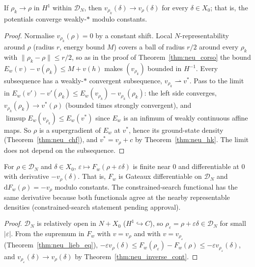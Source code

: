 \begin{theorem}
  \label{thm:neu_inverse_cont}
  \leanok
  If $\rho_k\to\rho$ in $H^1$ within $\mathcal D_N$, then $v_{\rho_k}(\delta)\to v_\rho(\delta)$ for every $\delta\in X_0$; that is,
  the potentials converge weakly-$*$ modulo constants.
\end{theorem}
\begin{proof}
  \leanok
  Normalise $v_{\rho_k}(\rho)=0$ by a constant shift. Local $N$-representability around $\rho$ (radius $r$, energy bound $M$)
  covers a ball of radius $r/2$ around every $\rho_k$ with $\|\rho_k-\rho\|\le r/2$, so as in the proof of
  Theorem~\ref{thm:neu_corso} the bound $E_w(v)-v(\rho_k)\le M+v(h)$ makes $(v_{\rho_k})$ bounded in $H^{-1}$. Every
  subsequence has a weakly-$*$ convergent subsequence, $v_{\rho_k}\rightharpoonup v^*$. Pass to the limit in
  $E_w(v')-v'(\rho_k)\le E_w(v_{\rho_k})-v_{\rho_k}(\rho_k)$: the left side converges, $v_{\rho_k}(\rho_k)\to v^*(\rho)$
  (bounded times strongly convergent), and $\limsup E_w(v_{\rho_k})\le E_w(v^*)$ since $E_w$ is an infimum of weakly
  continuous affine maps. So $\rho$ is a supergradient of $E_w$ at $v^*$, hence its ground-state density
  (Theorem~\ref{thm:neu_chf}), and $v^*=v_\rho+c$ by Theorem~\ref{thm:neu_hk}. The limit does not depend on the subsequence.
\end{proof}

\begin{theorem}
  \label{thm:neu_lieb_diff}
  \leanok
  For $\rho\in\mathcal D_N$ and $\delta\in X_0$, $\varepsilon\mapsto F_w(\rho+\varepsilon\delta)$ is finite near $0$ and
  differentiable at $0$ with derivative $-v_\rho(\delta)$. That is, $F_w$ is Gateaux differentiable on $\mathcal D_N$ and
  $\mathrm dF_w(\rho)=-v_\rho$ modulo constants. The constrained-search functional has the
  same derivative because both functionals agree at the nearby representable densities
  (constrained-search statement pending approval).
\end{theorem}
\begin{proof}
  \leanok
  $\mathcal D_N$ is relatively open in $N+X_0$ ($H^1\hookrightarrow C$), so $\rho_\varepsilon=\rho+\varepsilon\delta\in\mathcal D_N$
  for small $|\varepsilon|$. From the supremum in $F_w$ with $v=v_\rho$ and with $v=v_{\rho_\varepsilon}$
  (Theorem~\ref{thm:neu_lieb_eq}),
  $-\varepsilon v_\rho(\delta)\le F_w(\rho_\varepsilon)-F_w(\rho)\le-\varepsilon v_{\rho_\varepsilon}(\delta)$, and
  $v_{\rho_\varepsilon}(\delta)\to v_\rho(\delta)$ by Theorem~\ref{thm:neu_inverse_cont}.
\end{proof}

